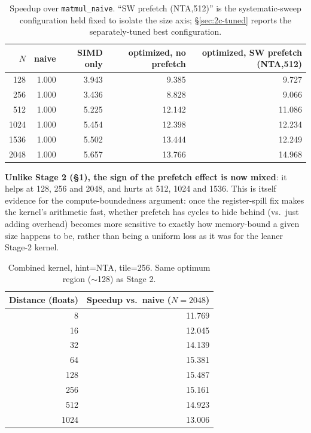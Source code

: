 \documentclass[11pt]{article}
\begin{document}
\begin{table}[h]
\centering
\begin{tabular}{r r r r r}
\toprule
$N$ & {naive} & {SIMD only} & {optimized, no prefetch} & {optimized, SW prefetch (NTA,512)} \\
\midrule
128  & 1.000 & 3.943 & 9.385  & 9.727 \\
256  & 1.000 & 3.436 & 8.828  & 9.066 \\
512  & 1.000 & 5.225 & 12.142 & 11.086 \\
1024 & 1.000 & 5.454 & 12.398 & 12.234 \\
1536 & 1.000 & 5.502 & 13.444 & 12.249 \\
2048 & 1.000 & 5.657 & 13.766 & 14.968 \\
\bottomrule
\end{tabular}
\caption{Speedup over \texttt{matmul\_naive}. ``SW prefetch (NTA,512)'' is the systematic-sweep configuration held fixed to isolate the size axis; \S\ref{sec:2c-tuned} reports the separately-tuned best configuration.}
\end{table}

\textbf{Unlike Stage 2 (\S1), the sign of the prefetch effect is now mixed}: it helps at
128, 256 and 2048, and hurts at 512, 1024 and 1536. This is itself evidence for the
compute-boundedness argument: once the register-spill fix makes the kernel's arithmetic
fast, whether prefetch has cycles to hide behind (vs.\ just adding overhead) becomes more
sensitive to exactly how memory-bound a given size happens to be, rather than being a
uniform loss as it was for the leaner Stage-2 kernel.

\begin{table}[h]
\centering
\begin{tabular}{r r}
\toprule
Distance (floats) & {Speedup vs.\ naive ($N{=}2048$)} \\
\midrule
8    & 11.769 \\
16   & 12.045 \\
32   & 14.139 \\
64   & 15.381 \\
128  & 15.487 \\
256  & 15.161 \\
512  & 14.923 \\
1024 & 13.006 \\
\bottomrule
\end{tabular}
\caption{Combined kernel, hint=NTA, tile=256. Same optimum region ($\sim$128) as Stage 2.}
\end{table}
\end{document}
